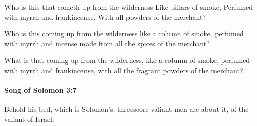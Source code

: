 			\begin{versebox}
					\item[BHS] 
					\item[LXX] 
					\item[ASV] Who is this that cometh up from the wilderness Like pillars of smoke, Perfumed with myrrh and frankincense, With all powders of the merchant?
					\item[NIV] Who is this coming up from the wilderness like a column of smoke, perfumed with myrrh and incense made from all the spices of the merchant?
					\item[NRSV] What is that coming up from the wilderness, like a column of smoke, perfumed with myrrh and frankincense, with all the fragrant powders of the merchant?
			\end{versebox}

		\paragraph{Song of Solomon 3:7} %
			\label{SONGOFSOLOMON-3-7}

			Behold his bed, which is Solomon’s; threescore valiant men are about it, of the valiant of Israel.

